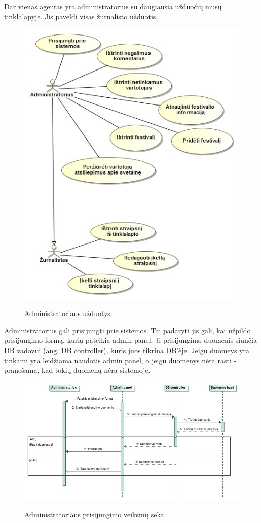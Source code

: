 ﻿\documentclass{VUMIFPSkursinis}
\begin{document}
Dar vienas agentas yra administratorius su daugiausia užduočių mūsų tinklalapyje. Jis paveldi visas žurnalisto užduotis.

\begin{figure}[H]
    \centering
    \includegraphics[scale=0.6]{img/Pav/Administratorius}
    \label{img:uml9}
	\caption{Administratoriaus užduotys}
\end{figure}	

Administratorius gali prisijungti prie sistemos. Tai padaryti jis gali, kai užpildo prisijungimo formą, kurią pateikia admin panel. Ji prisijungimo duomenis siunčia DB vadovui (ang. DB controller), kuris juos tikrina DB’ėje. Jeigu duomeys yra tinkami yra leidžiama naudotis admin panel, o jeigu duomenys nėra rasti - pranešama, kad tokių duomenų nėra sistemoje.

\begin{figure}[H]
    \centering
    \includegraphics[scale=0.5]{img/Pav/AdminPrisijungtiPrieSis}
    \label{img:uml10}
	\caption{Administratoriaus prisijungimo veiksmų seka}
\end{figure}
\end{document}
